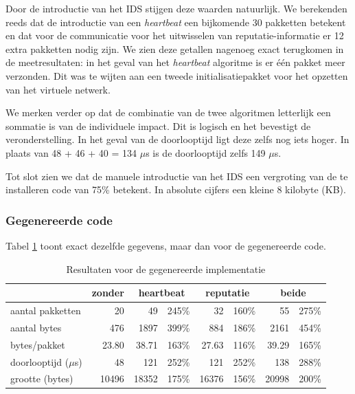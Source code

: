 Door de introductie van het IDS stijgen deze waarden natuurlijk. We berekenden
reeds dat de introductie van een \emph{heartbeat} een bijkomende 30 pakketten
betekent en dat voor de communicatie voor het uitwisselen van
reputatie-informatie er 12 extra pakketten nodig zijn. We zien deze getallen
nagenoeg exact terugkomen in de meetresultaten: in het geval van het
\emph{heartbeat} algoritme is er \'e\'en pakket meer verzonden. Dit was te
wijten aan een tweede initialisatiepakket voor het opzetten van het virtuele
netwerk.

We merken verder op dat de combinatie van de twee algoritmen letterlijk een
sommatie is van de individuele impact. Dit is logisch en het bevestigt de
veronderstelling. In het geval van de doorlooptijd ligt deze zelfs nog iets
hoger. In plaats van 48 + 46 + 40 = 134 $\mu$s is de doorlooptijd zelfs 149
$\mu$s.

Tot slot zien we dat de manuele introductie van het IDS een vergroting van de
te installeren code van 75\% betekent. In absolute cijfers een kleine 8
kilobyte (KB).

\vspace{-3mm}

\subsubsection{Gegenereerde code}

Tabel \ref{tbl:generated} toont exact dezelfde gegevens, maar dan voor de
gegenereerde code.

\begin{table}[H]
  \centering
  \begin{tabular}{l|r|rr|rr|rr}
  \hline
      & zonder & \multicolumn{2}{c|}{heartbeat} & \multicolumn{2}{c|}{reputatie} & \multicolumn{2}{c}{beide} \\
  \hline
  \hline
  
aantal pakketten      &    20	   &    49	  & 245\%	&    32	   & 160\% &    55	  & 275\% \\
aantal bytes          &   476	   &  1897	  & 399\%	&   884	   & 186\% &  2161	  & 454\% \\
bytes/pakket          &    23.80 &  	38.71	& 163\%	&    27.63 & 116\% &    39.29	& 165\% \\
doorlooptijd ($\mu$s) &    48    &   121	  & 252\%	&   121	   & 252\% &   138	  & 288\% \\
grootte (bytes)       &	10496	   & 18352	  & 175\%	& 16376	   & 156\% & 20998	  & 200\% \\

  \hline
  \end{tabular}
  \caption{Resultaten voor de gegenereerde implementatie}
  \label{tbl:generated}
\end{table}

